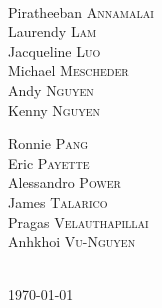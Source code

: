 \documentclass[12pt]{article}
\begin{document}
\begin{titlepage}
\\
[0.5cm]
\begin{minipage}{0.45\textwidth}
\begin{flushleft} \large
Piratheeban \textsc{Annamalai}  \\
Laurendy \textsc{Lam}  \\
Jacqueline \textsc{Luo}  \\
Michael \textsc{Mescheder}  \\
Andy \textsc{Nguyen}    \\
Kenny \textsc{Nguyen}  \\
\end{flushleft}
\end{minipage}
\begin{minipage}{0.45\textwidth}
\begin{flushright} \large
Ronnie \textsc{Pang}    \\
Eric \textsc{Payette}\\
Alessandro \textsc{Power}    \\
James \textsc{Talarico}    \\
Pragas \textsc{Velauthapillai}    \\
Anhkhoi \textsc{Vu-Nguyen}    \\

\end{flushright}
\end{minipage}\\[2cm]



{\large \today}\\[1cm] %




\end{titlepage}
\end{document}
